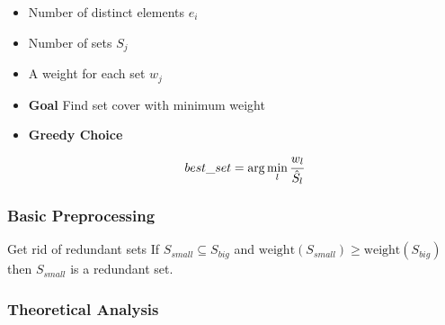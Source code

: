 \documentclass{beamer}
\newlength\myheight
\newlength\mydepth
\newcommand*\inlinegraphics[1]{%
  \settototalheight\myheight{Xygp}%
  \settodepth\mydepth{Xygp}%
  \raisebox{-\mydepth}{\texttt{[image: \#1]}}%
}
\begin{document}
\begin{frame}
\begin{minipage}{0.45\textwidth}
\begin{overlayarea}{\textwidth}{0.5\textheight}
%
\end{overlayarea}%
\end{minipage}%
\begin{minipage}{0.55\textwidth} 
\begin{itemize}
\item<1-> Number of distinct elements $e_i$
\item<2-> Number of sets $S_j$
\item<3-> A weight for each set $w_j$
\item<4-> \textbf{Goal} Find set cover with minimum weight
\item<5> \textbf{Greedy Choice} $$best\_set = \arg \min_{l} \cfrac{w_l}{\hat{S}_l}$$
\end{itemize}
\end{minipage}
\end{frame}

\begin{frame}
\frametitle{Basic Preprocessing}
\begin{block}{Get rid of redundant sets \inlinegraphics{sweep.eps}}
If $S_{small} \subseteq S_{big}$ and $\text{weight}(S_{small})\geq \text{weight}(S_{big})$ then $S_{small}$ is a redundant set.
\end{block}
\end{frame}

\begin{frame}
\frametitle{Theoretical Analysis}
\end{frame}
\end{document}
